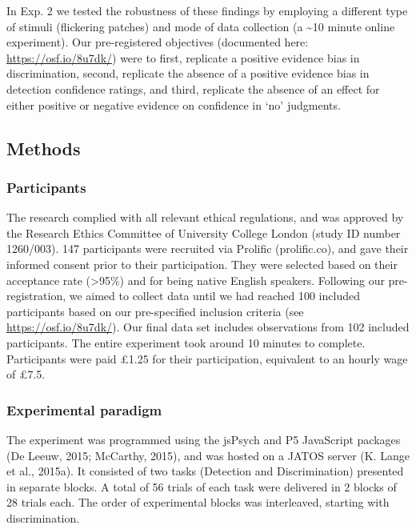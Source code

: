 \documentclass[12pt,twoside]{reedthesis}
\begin{document}
In Exp. 2 we tested the robustness of these findings by employing a different type of stimuli (flickering patches) and mode of data collection (a \textasciitilde10 minute online experiment). Our pre-registered objectives (documented here: \url{https://osf.io/8u7dk/}) were to first, replicate a positive evidence bias in discrimination, second, replicate the absence of a positive evidence bias in detection confidence ratings, and third, replicate the absence of an effect for either positive or negative evidence on confidence in `no' judgments.

\hypertarget{methods-1}{%
\subsection{Methods}\label{methods-1}}

\hypertarget{participants-5}{%
\subsubsection{Participants}\label{participants-5}}

The research complied with all relevant ethical regulations, and was approved by the Research Ethics Committee of University College London (study ID number 1260/003). 147 participants were recruited via Prolific (prolific.co), and gave their informed consent prior to their participation. They were selected based on their acceptance rate (\textgreater95\%) and for being native English speakers. Following our pre-registration, we aimed to collect data until we had reached 100 included participants based on our pre-specified inclusion criteria (see \url{https://osf.io/8u7dk/}). Our final data set includes observations from 102 included participants. The entire experiment took around 10 minutes to complete. Participants were paid £1.25 for their participation, equivalent to an hourly wage of £7.5.

\hypertarget{experimental-paradigm}{%
\subsubsection{Experimental paradigm}\label{experimental-paradigm}}

The experiment was programmed using the jsPsych and P5 JavaScript packages (De Leeuw, 2015; McCarthy, 2015), and was hosted on a JATOS server (K. Lange et al., 2015a). It consisted of two tasks (Detection and Discrimination) presented in separate blocks. A total of 56 trials of each task were delivered in 2 blocks of 28 trials each. The order of experimental blocks was interleaved, starting with discrimination.
\end{document}
